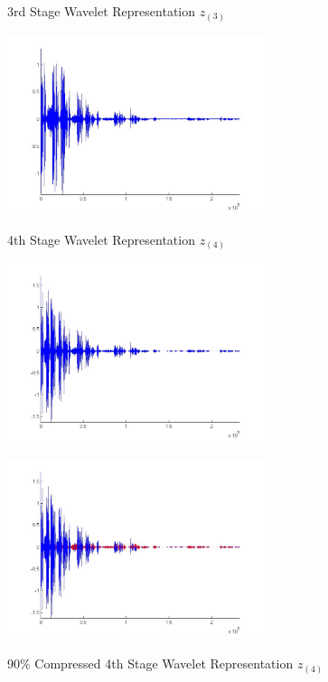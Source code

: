 \documentclass{report}
\begin{document}
\begin{figure}
\center
\caption{3rd Stage Wavelet Representation $z_{(3)}$}
\label{fig:stage3}
\includegraphics[height=5.25cm]{stage3}

\caption{4th Stage Wavelet Representation $z_{(4)}$}
\label{fig:stage4}
\includegraphics[height=5.25cm]{stage4}

\caption{90\% Compressed 4th Stage Wavelet Representation $z_{(4)}$}
\includegraphics[height=5.25cm]{stage4p9}
\label{fig:stage4p9}
\end{figure}
\end{document}
